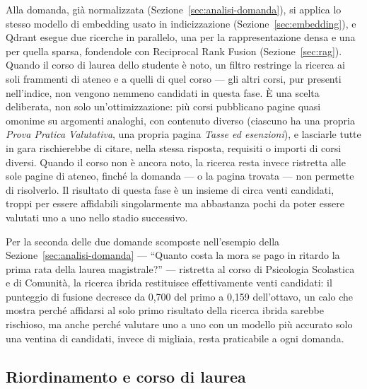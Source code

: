 Alla domanda, già normalizzata (Sezione~\ref{sec:analisi-domanda}), si applica lo stesso modello di embedding usato
in indicizzazione (Sezione~\ref{sec:embedding}), e Qdrant esegue due ricerche in parallelo, una per la
rappresentazione densa e una per quella sparsa, fondendole con Reciprocal Rank Fusion (Sezione~\ref{sec:rag}). Quando il corso di laurea dello studente è noto, un filtro restringe la ricerca ai soli
frammenti di ateneo e a quelli di quel corso --- gli altri corsi, pur presenti nell'indice, non vengono nemmeno
candidati in questa fase. È una scelta deliberata, non solo un'ottimizzazione: più corsi pubblicano pagine quasi
omonime su argomenti analoghi, con contenuto diverso (ciascuno ha una propria \emph{Prova Pratica Valutativa}, una
propria pagina \emph{Tasse ed esenzioni}), e lasciarle tutte in gara rischierebbe di citare, nella stessa risposta,
requisiti o importi di corsi diversi. Quando il corso non è ancora noto, la ricerca resta invece ristretta alle sole
pagine di ateneo, finché la domanda --- o la pagina trovata --- non permette di risolverlo.
Il risultato di questa fase è un insieme di circa venti candidati, troppi per essere affidabili singolarmente ma
abbastanza pochi da poter essere valutati uno a uno nello stadio successivo.

Per la seconda delle due domande scomposte nell'esempio della Sezione~\ref{sec:analisi-domanda} --- ``Quanto costa
la mora se pago in ritardo la prima rata della laurea magistrale?'' --- ristretta al corso di Psicologia
Scolastica e di Comunità, la ricerca ibrida restituisce effettivamente venti candidati: il punteggio di fusione
decresce da 0,700 del primo a 0,159 dell'ottavo, un calo che mostra perché affidarsi al solo primo risultato della
ricerca ibrida sarebbe rischioso, ma anche perché valutare uno a uno con un modello più accurato solo una ventina di
candidati, invece di migliaia, resta praticabile a ogni domanda.

\subsection{Riordinamento e corso di laurea}\label{sec:corso-priorita}

